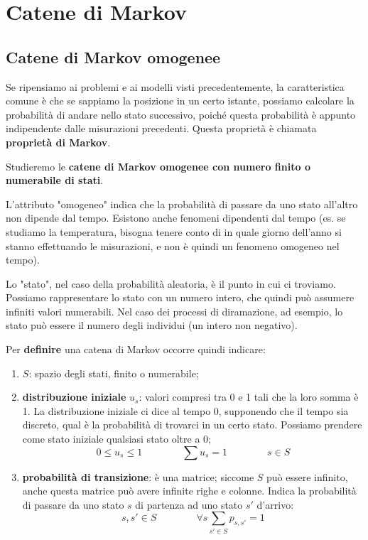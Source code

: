 \documentclass[a4paper,12pt]{book}
\begin{document}
\chapter{Catene di Markov}
\section{Catene di Markov omogenee}
Se ripensiamo ai problemi e ai modelli visti precedentemente, la caratteristica comune è che se sappiamo la posizione in un certo istante, possiamo calcolare la probabilità di andare nello stato successivo, poiché questa probabilità è appunto indipendente dalle misurazioni precedenti. Questa proprietà è chiamata \textbf{proprietà di Markov}.

Studieremo le \textbf{catene di Markov omogenee con numero finito o numerabile di stati}.

L'attributo "omogeneo" indica che la probabilità di passare da uno stato all'altro non dipende dal tempo. Esistono anche fenomeni dipendenti dal tempo (es. se studiamo la temperatura, bisogna tenere conto di in quale giorno dell'anno si stanno effettuando le misurazioni, e non è quindi un fenomeno omogeneo nel tempo).

Lo "stato", nel caso della probabilità aleatoria, è il punto in cui ci troviamo. Possiamo rappresentare lo stato con un numero intero, che quindi può assumere infiniti valori numerabili. Nel caso dei processi di diramazione, ad esempio, lo stato può essere il numero degli individui (un intero non negativo). 

Per \textbf{definire} una catena di Markov occorre quindi indicare:
\begin{enumerate}
	\item $S$: spazio degli stati, finito o numerabile;
	\item \textbf{distribuzione iniziale} $ u_s $: valori compresi tra 0 e 1 tali che la loro somma è 1. La distribuzione iniziale ci dice al tempo 0, supponendo che il tempo sia discreto, qual è la probabilità di trovarci in un certo stato. Possiamo prendere come stato iniziale qualsiasi stato oltre a 0;
	$$ 0 \le u_s \le 1 \qquad \qquad \sum u_s  = 1 \qquad \qquad s \in S $$
	\item \textbf{probabilità di transizione}: è una matrice; siccome $ S $ può essere infinito, anche questa matrice può avere infinite righe e colonne. Indica la probabilità di passare da uno stato $ s $ di partenza ad uno stato $ s' $ d'arrivo:
	$$ s, s' \in S \qquad \qquad \forall s \sum_{s'\in S} p_{s,s'} = 1 $$
\end{enumerate}
\end{document}
